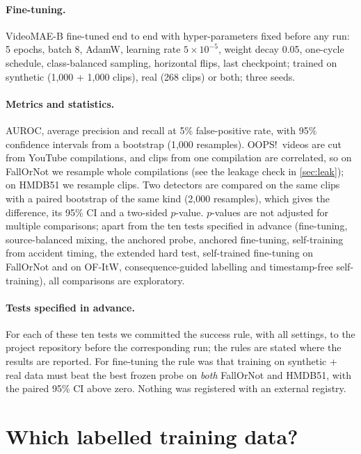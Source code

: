 \documentclass[10pt,twocolumn,letterpaper]{article}
\begin{document}
\paragraph{Fine-tuning.} VideoMAE-B fine-tuned end to end with hyper-parameters fixed before any run: 5 epochs, batch 8, AdamW, learning rate $5\times10^{-5}$, weight decay 0.05, one-cycle schedule, class-balanced sampling, horizontal flips, last checkpoint; trained on synthetic (1,000 + 1,000 clips), real (268 clips) or both; three seeds.

\paragraph{Metrics and statistics.} AUROC, average precision and recall at 5\% false-positive rate, with 95\% confidence intervals from a bootstrap (1,000 resamples). OOPS!\ videos are cut from YouTube compilations, and clips from one compilation are correlated, so on FallOrNot we resample whole compilations (see the leakage check in \cref{sec:leak}); on HMDB51 we resample clips. Two detectors are compared on the same clips with a paired bootstrap of the same kind (2,000 resamples), which gives the difference, its 95\% CI and a two-sided $p$-value. $p$-values are not adjusted for multiple comparisons; apart from the ten tests specified in advance (fine-tuning, source-balanced mixing, the anchored probe, anchored fine-tuning, self-training from accident timing, the extended hard test, self-trained fine-tuning on FallOrNot and on OF-ItW, consequence-guided labelling and timestamp-free self-training), all comparisons are exploratory.

\paragraph{Tests specified in advance.} For each of these ten tests we committed the success rule, with all settings, to the project repository before the corresponding run; the rules are stated where the results are reported. For fine-tuning the rule was that training on synthetic + real data must beat the best frozen probe on \emph{both} FallOrNot and HMDB51, with the paired 95\% CI above zero. Nothing was registered with an external registry.

\section{Which labelled training data?}
\end{document}
